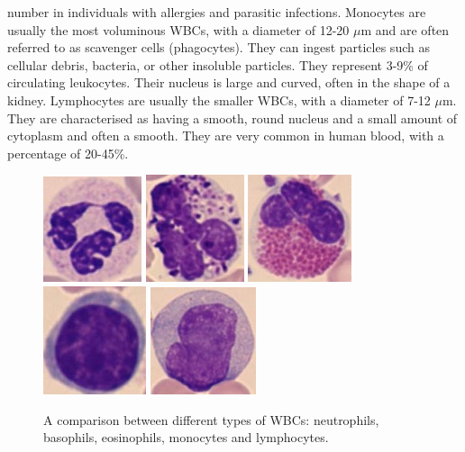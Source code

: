 \documentclass[final,a4paper,12pt,english]{UnicaPhdThesis3}
\begin{document}
number in individuals with allergies and parasitic infections. Monocytes are usually the most voluminous WBCs, with a diameter of 12-20 $\mu$m and are often referred to as scavenger cells (phagocytes). They can ingest particles such as cellular debris, bacteria, or other insoluble particles. They represent 3-9\% of circulating leukocytes. Their nucleus is large and curved, often in the shape of a kidney. Lymphocytes are usually the smaller WBCs, with a diameter of 7-12 $\mu$m. They are characterised as having a smooth, round nucleus and a small amount of cytoplasm and often a smooth. They are very common in human blood, with a percentage of 20-45\%. 

\begin{figure}[!htbp]
\centering
\includegraphics[height=0.125\textheight]{images/crop-Fig2-1}
\includegraphics[height=0.125\textheight]{images/crop-Fig2-2}
\includegraphics[height=0.125\textheight]{images/crop-Fig2-3}
\includegraphics[height=0.125\textheight]{images/crop-Fig2-4}
\includegraphics[height=0.125\textheight]{images/crop-Fig2-5}
\caption{\label{fig:leukocytes}A comparison between different types of WBCs: neutrophils, basophils, eosinophils, monocytes and lymphocytes.}
\end{figure}
\end{document}
